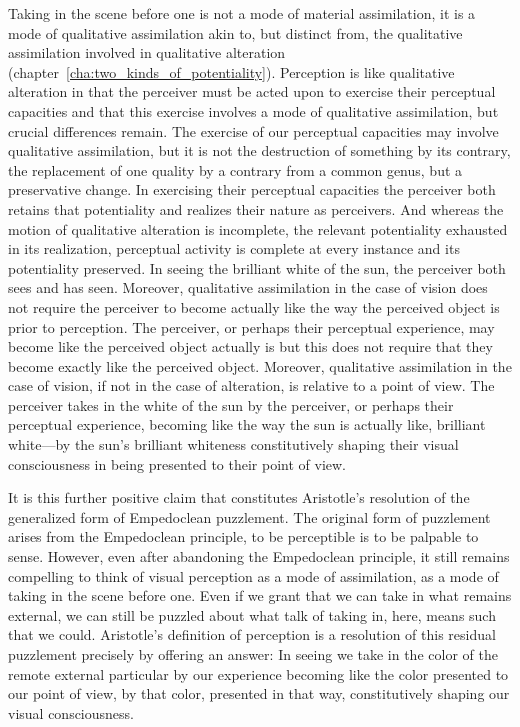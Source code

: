 Taking in the scene before one is not a mode of material assimilation, it is a mode of qualitative assimilation akin to, but distinct from, the qualitative assimilation involved in qualitative alteration (chapter~\ref{cha:two_kinds_of_potentiality}). Perception is like qualitative alteration in that the perceiver must be acted upon to exercise their perceptual capacities and that this exercise involves a mode of qualitative assimilation, but crucial differences remain. The exercise of our perceptual capacities may involve qualitative assimilation, but it is not the destruction of something by its contrary, the replacement of one quality by a contrary from a common genus, but a preservative change. In exercising their perceptual capacities the perceiver both retains that potentiality and realizes their nature as perceivers. And whereas the motion of qualitative alteration is incomplete, the relevant potentiality exhausted in its realization, perceptual activity is complete at every instance and its potentiality preserved. In seeing the brilliant white of the sun, the perceiver both sees and has seen. Moreover, qualitative assimilation in the case of vision does not require the perceiver to become actually like the way the perceived object is prior to perception. The perceiver, or perhaps their perceptual experience, may become like the perceived object actually is but this does not require that they become exactly like the perceived object. Moreover, qualitative assimilation in the case of vision, if not in the case of alteration, is relative to a point of view. The perceiver takes in the white of the sun by the perceiver, or perhaps their perceptual experience, becoming like the way the sun is actually like, brilliant white---by the sun's brilliant whiteness constitutively shaping their visual consciousness in being presented to their point of view.

It is this further positive claim that constitutes Aristotle's resolution of the generalized form of Empedoclean puzzlement. The original form of puzzlement arises from the Empedoclean principle, to be perceptible is to be palpable to sense. However, even after abandoning the Empedoclean principle, it still remains compelling to think of visual perception as a mode of assimilation, as a mode of taking in the scene before one. Even if we grant that we can take in what remains external, we can still be puzzled about what talk of taking in, here, means such that we could. Aristotle's definition of perception is a resolution of this residual puzzlement precisely by offering an answer: In seeing we take in the color of the remote external particular by our experience becoming like the color presented to our point of view, by that color, presented in that way, constitutively shaping our visual consciousness.

